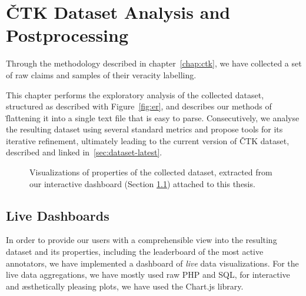 
\chapter{ČTK Dataset Analysis and Postprocessing}
\label{chap:dataset}

Through the methodology described in chapter~\ref{chap:ctk}, we have collected a set of raw claims and samples of their veracity labelling.

This chapter performs the exploratory analysis of the collected dataset, structured as described with Figure~\ref{fig:er}, and describes our methods of \"{flattening} it into a single text file that is easy to parse. Consecutively, we analyse the resulting dataset using several standard metrics and propose tools for its iterative refinement, ultimately leading to the current version of \textsf{ČTK} dataset, described and linked in~\ref{sec:dataset-latest}.

\begin{figure}[H]
\caption[Visualizations of properties of the collected dataset]{Visualizations of properties of the collected dataset, extracted from our interactive dashboard (Section \ref{sec:dashboard}) attached to this thesis.}
\label{fig:dashboard}
\end{figure} %

\section{Live Dashboards}
\label{sec:dashboard}
In order to provide our users with a comprehensible view into the resulting dataset and its properties, including the leaderboard of the most active annotators, we have implemented a dashboard of \textit{live} data visualizations. For the live data aggregations, we have mostly used raw \textsf{PHP} and \textsf{SQL}, for interactive and \ae{}sthetically pleasing plots, we have used the \textsf{Chart.js} library.

